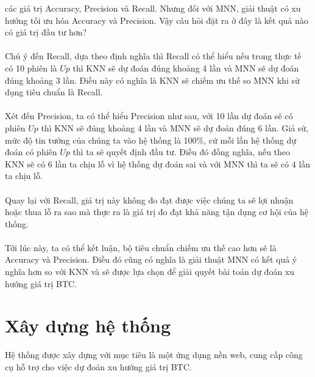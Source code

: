 các giá trị Accuracy, Precision và Recall. Nhưng đối với MNN, giải thuật có xu 
hướng tối ưu hóa Accuracy và Precision. Vậy câu hỏi đặt ra ở đây là kết quả nào 
có giá trị đầu tư hơn?\\\\
Chú ý đến Recall, dựa theo định nghĩa thì Recall có thể hiểu nếu trong thực tế 
có 10 phiên là $Up$ thì KNN sẽ dự đoán đúng khoảng 4 lần và MNN sẽ dự đoán đúng 
khoảng 3 lần. Điều này có nghĩa là KNN sẽ chiếm ưu thế so MNN khi sử dụng tiêu 
chuẩn là Recall.\\\\
Xét đến Precision, ta có thể hiểu Precision như sau, với 10 lần dự đoán sẽ có 
phiên $Up$ thì KNN sẽ đúng khoảng 4 lần và MNN sẽ dự đoán đúng 6 lần. Giả sử, 
mức độ tin tưởng của chúng ta vào hệ thống là 100\%, cứ mỗi lần hệ thống dự 
đoán có phiên $Up$ thì ta sẽ quyết định đầu tư. Điều đó đồng nghĩa, nếu theo 
KNN sẽ có 6 lần ta chịu lỗ vì hệ thống dự đoán sai và với MNN thì ta sẽ có 4 
lần ta chịu lỗ.\\\\
Quay lại với Recall, giá trị này không đo đạt được việc chúng ta sẽ lợi nhuận 
hoặc thua lỗ ra sao mà thực ra là giá trị đo đạt khả năng tận dụng cơ hội của 
hệ thống.\\\\
Tới lúc này, ta có thể kết luận, bộ tiêu chuẩn chiếm ưu thế cao hơn sẽ là Accuracy 
và Precision. Điều đó cũng có nghĩa là giải thuật MNN có kết quả ý nghĩa hơn so 
với KNN và sẽ được lựa chọn để giải quyết bài toán dự đoán xu hướng giá trị BTC.
\section{Xây dựng hệ thống}
Hệ thống được xây dựng với mục tiêu là một ứng dụng nền web, cung cấp công cụ hỗ 
trợ cho việc dự đoán xu hướng giá trị BTC.
